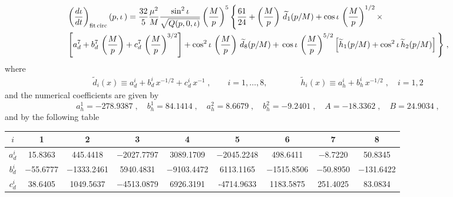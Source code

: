 \documentclass[aps,prd,twocolumn,showpacs,groupedaddress,nofootinbib]{revtex4}
\newcommand\T{\rule{0pt}{3ex}}
\newcommand\B{\rule[-2ex]{0pt}{0pt}}
\begin{document}
\begin{widetext}
\begin{align}
  &\left(\frac{d\iota}{dt}\right)_{\rm fit\,
    circ}
(p,\iota\,)=\frac{32}{5}\frac{\mu^2}{M}\frac{\sin^2\iota}
  {\sqrt{Q(p,0,\iota)}}\left(\frac{M}{p}\right)^{5}
  \Bigg\{\frac{61}{24}+\left(\frac{M}{p}\right)\,\widetilde{d}_1(p/M)+
  \cos\iota\,\left(\frac{M}{p}\right)^{1/2}\times\nonumber\\&
  \left[a_d^7+b_d^7\,\left(\frac{M}{p}\right)+c_d^7\,
    \left(\frac{M}{p}\right)^{3/2}\right]
  +\cos^2\iota\,\left(\frac{M}{p}\right)\,\widetilde{d}_8(p/M)+
  \,\cos\iota\,\left(\frac{M}{p}\right)^{5/2}
  \left[\widetilde{h}_1(p/M)+\cos^2\iota\,
    \widetilde{h}_2(p/M)\right]\Bigg\}\;,\label{IdotFitCirc}
\end{align}
where
\begin{gather}
  \widetilde{d}_i(x) \equiv a_d^i+b_d^i\,x^{-1/2}+c_d^i\,x^{-1}\;, \qquad
  i=1,\ldots,8,
  \qquad \qquad \widetilde{h}_i(x)\equiv a_h^i+b_h^i\,x^{-1/2}\;,
  \quad i=1,2
\end{gather}
and the numerical coefficients are given by
\begin{equation}
a_h^1=-278.9387 \;,\quad b_h^1=84.1414\;,\quad
a_h^2=8.6679 \;,\quad  b_h^2=-9.2401\;,\quad
A= -18.3362 \;,\quad B= 24.9034 \;,
 \end{equation}
and by the following table
\begin{table}[h]
\begin{tabular}{|c|c|c|c|c|c|c|c|c|}
\hline
\T \B$i$ & \B1 &\B2 &\B3 &\B4 &\B5 &\B6 &\B7 &\B8\\
\hline
\T \B$a_d^i$ & 15.8363 & 445.4418 & $-$2027.7797 & 3089.1709 & $-$2045.2248 & 498.6411 & $-$8.7220 & 50.8345 \\
\T \B$b_d^i$ & $-$55.6777 & $-$1333.2461 & 5940.4831 & $-$9103.4472 & 6113.1165 & $-$1515.8506 & $-$50.8950 & $-$131.6422 \\
\T \B$c_d^i$ & 38.6405  & 1049.5637 & $-$4513.0879 & 6926.3191 &-4714.9633 & 1183.5875 & 251.4025& 83.0834\\
\hline
\end{tabular}
\label{table:a_d_i_coefficients}
\end{table}



\end{widetext}
\end{document}
